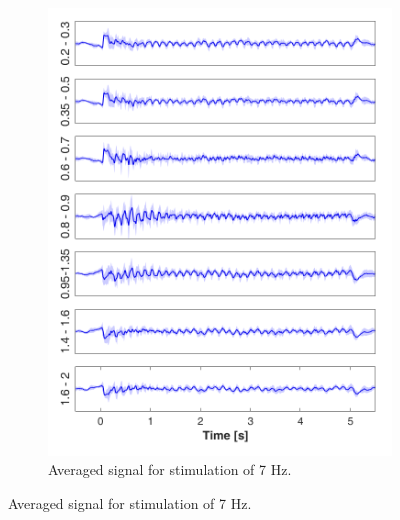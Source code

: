 \documentclass{pracalicmgr}
\begin{document}
\begin{figure}[H]
\begin{subfigure}{.5\textwidth}
	\includegraphics[width=1.\linewidth]{srednie_7Hz_5s.png}
	\caption{Averaged signal for stimulation of 7 Hz.}
	\label{rys:srednie_7Hz}
    \end{subfigure}
	

\end{figure}
\end{document}
